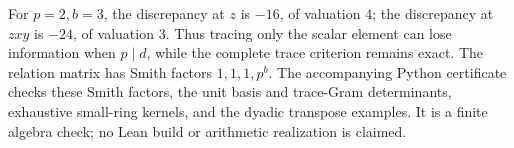 For $p=2,b=3$, the discrepancy at $z$ is $-16$, of valuation $4$;
the discrepancy at $zxy$ is $-24$, of valuation $3$.  Thus tracing
only the scalar element can lose information when $p\mid d$, while
the complete trace criterion remains exact.  The relation matrix has
Smith factors $1,1,1,p^b$.
The accompanying Python certificate checks these Smith factors,
the unit basis and trace-Gram determinants, exhaustive small-ring
kernels, and the dyadic transpose examples.  It is a finite algebra
check; no Lean build or arithmetic realization is claimed.
